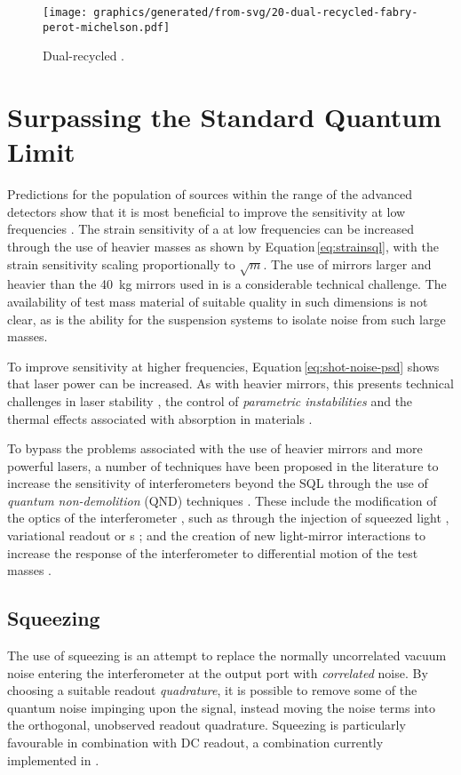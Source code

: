 \begin{figure}
  \centering
  \texttt{[image: graphics/generated/from-svg/20-dual-recycled-fabry-perot-michelson.pdf]}
  \caption[\DRFPMI{}]{\label{fig:drfpmi}Dual-recycled \FPMI{}.}
\end{figure}

\section{\label{sec:sub-sql-techniques}Surpassing the Standard Quantum Limit}
Predictions for the population of sources within the range of the advanced detectors show that it is most beneficial to improve the sensitivity at low frequencies . The strain sensitivity of a \MI{} at low frequencies can be increased through the use of heavier masses as shown by Equation\,\ref{eq:strainsql}, with the strain sensitivity scaling proportionally to $\sqrt{m}$. The use of mirrors larger and heavier than the \SI{40}{\kilo\gram} mirrors used in \ALIGO{} is a considerable technical challenge. The availability of test mass material of suitable quality in such dimensions is not clear, as is the ability for the suspension systems to isolate noise from such large masses.

To improve sensitivity at higher frequencies, Equation\,\ref{eq:shot-noise-psd} shows that laser power can be increased. As with heavier mirrors, this presents technical challenges in laser stability \cite{Hildebrandt2007}, the control of \emph{parametric instabilities} \cite{Evans2015} and the thermal effects associated with absorption in materials \cite{Steinlechner2016}.

To bypass the problems associated with the use of heavier mirrors and more powerful lasers, a number of techniques have been proposed in the literature to increase the sensitivity of interferometers beyond the \gls{SQL} through the use of \emph{quantum non-demolition} (\gls{QND}) techniques \cite{Braginsky1995}. These include the modification of the optics of the interferometer \cite{Kimble2001}, such as through the injection of squeezed light \cite{Caves1981}, variational readout \cite{Vyatchanin1995, Vyatchanin1996} or \SM{}s \cite{Braginsky1990}; and the creation of new light-mirror interactions to increase the response of the interferometer to differential motion of the test masses \cite{Chen2011}.

\subsection{\label{sec:squeezing}Squeezing}
The use of squeezing is an attempt to replace the normally uncorrelated vacuum noise entering the interferometer at the output port with \emph{correlated} noise. By choosing a suitable readout \emph{quadrature}, it is possible to remove some of the quantum noise impinging upon the signal, instead moving the noise terms into the orthogonal, unobserved readout quadrature. Squeezing is particularly favourable in combination with \gls{DC} readout, a combination currently implemented in \GEOHF{} \cite{Willke2006, Affeldt2014}.

